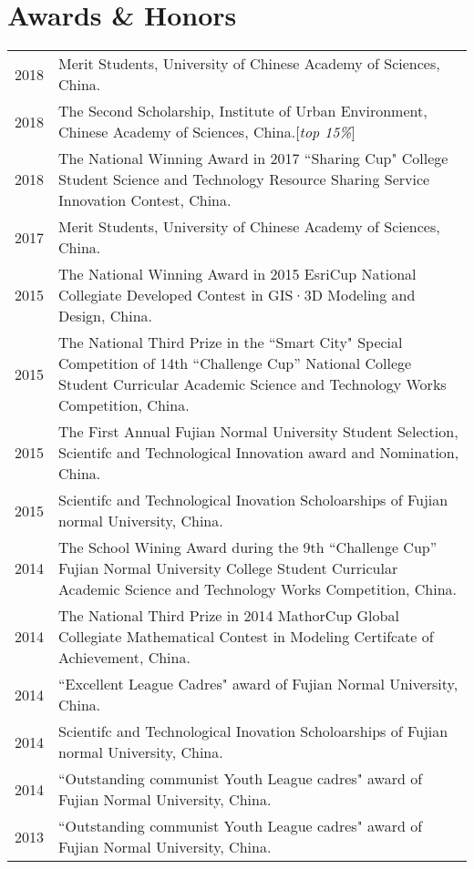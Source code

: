 \section*{Awards \& Honors}

\begin{tabular}{p{} p{}}
2018 & Merit Students, University of Chinese Academy of Sciences, China.\\
2018 & The Second Scholarship, Institute of Urban Environment, Chinese Academy of Sciences, China.[\textit{top 15\%}] \\
2018 & The National Winning Award in 2017 ``Sharing Cup" College Student Science and Technology Resource Sharing Service Innovation Contest, China.\\
2017 & Merit Students, University of Chinese Academy of Sciences, China. \\
2015 & The National Winning Award in 2015 EsriCup National Collegiate Developed Contest in GIS·3D Modeling and Design, China.\\
2015 & The National Third Prize in the ``Smart City" Special Competition of 14th “Challenge Cup” National College Student Curricular Academic Science and Technology Works Competition, China.\\
2015 & The First Annual Fujian Normal University Student Selection, Scientifc and Technological Innovation award and Nomination, China.\\
2015 & Scientifc and Technological Inovation Scholoarships of Fujian normal University, China.\\
2014 & The School Wining Award during the 9th “Challenge Cup” Fujian Normal University College Student Curricular Academic Science and Technology Works Competition, China.\\
2014 & The National Third Prize in 2014 MathorCup Global Collegiate Mathematical Contest in Modeling Certifcate of Achievement, China.\\
2014 & ``Excellent League Cadres" award of Fujian Normal University, China.\\
2014 & Scientifc and Technological Inovation Scholoarships of Fujian normal University, China.\\
2014 & ``Outstanding communist Youth League cadres" award of Fujian Normal University, China.\\
2013 & ``Outstanding communist Youth League cadres" award of Fujian Normal University, China.\\
\end{tabular}
